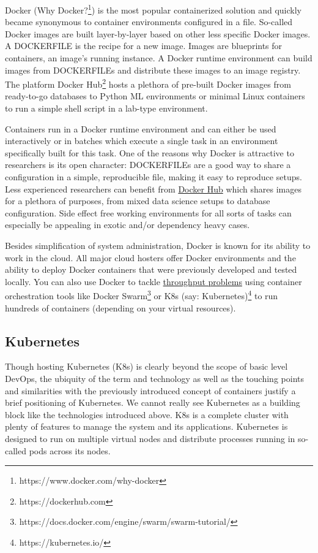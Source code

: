 \documentclass[
  12pt,
  letterpaper,
]{krantz}
\begin{document}
Docker (Why Docker?\footnote{https://www.docker.com/why-docker})
is the most popular containerized solution and quickly became synonymous
to container environments configured in a file. So-called Docker images
are built layer-by-layer based on other less specific Docker images. A
DOCKERFILE is the recipe for a new image. Images are
blueprints for containers, an image's running instance.
A Docker runtime environment can build images from
DOCKERFILEs and distribute these images to an image
registry. The platform Docker Hub\footnote{https://dockerhub.com} hosts
a plethora of pre-built Docker images from ready-to-go
databases to Python ML environments or
minimal Linux containers to run a simple shell script in a lab-type
environment.

Containers run in a Docker runtime environment and can
either be used interactively or in batches which execute a single task
in an environment specifically built for this task. One of the reasons
why Docker is attractive to researchers is its open character:
DOCKERFILEs are a good way to share a configuration in
a simple, reproducible file, making it easy to reproduce setups. Less
experienced researchers can benefit from
\href{https://hub.docker.com/}{Docker Hub} which shares images for a
plethora of purposes, from mixed data science setups to
database configuration. Side effect free working
environments for all sorts of tasks can especially be appealing in
exotic and/or dependency heavy cases.

Besides simplification of system administration, Docker is
known for its ability to work in the cloud. All major cloud hosters
offer Docker environments and the ability to deploy Docker containers
that were previously developed and tested locally. You can also use
Docker to tackle \protect\hyperlink{glossary}{throughput problems} using
container orchestration tools like Docker Swarm\footnote{https://docs.docker.com/engine/swarm/swarm-tutorial/}
or K8s (say: Kubernetes)\footnote{https://kubernetes.io/} to run
hundreds of containers (depending on your virtual resources).

\hypertarget{kubernetes}{%
\subsection{Kubernetes}\label{kubernetes}}

Though hosting Kubernetes (K8s) is clearly
beyond the scope of basic level DevOps, the ubiquity of
the term and technology as well as the touching points and similarities
with the previously introduced concept of containers justify a brief
positioning of Kubernetes. We cannot really see Kubernetes as a building
block like the technologies introduced above. K8s is a complete cluster
with plenty of features to manage the system and its applications.
Kubernetes is designed to run on multiple virtual nodes and distribute
processes running in so-called pods across its nodes.
\end{document}
